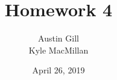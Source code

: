 \documentclass[12pt]{article}
\title{Homework 4}
\author{Austin Gill \\ Kyle MacMillan}
\date{April 26, 2019}
\begin{document}
\begin{titlingpage}
    \begin{center}
        \huge\thetitle{}\\
        \vspace{1cm}
        \large\theauthor{}\\
        \vspace{1cm}
        \large\thedate{}\\
        \vfill
    \end{center}
\end{titlingpage}

\begingroup
\hypersetup{linkcolor=black}
\tableofcontents
\todototoc
\listoftodos
\endgroup
\newpage



\end{document}
